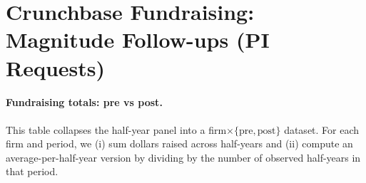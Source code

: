 \documentclass{article}
\newcommand{\cleanedresultsdir}{../results/cleaned/tex}
\begin{document}
\thispagestyle{empty}

\section*{Crunchbase Fundraising: Magnitude Follow-ups (PI Requests)}

\paragraph{Fundraising totals: pre vs post.}
This table collapses the half-year panel into a firm$\times\{\text{pre},\text{post}\}$ dataset.
For each firm and period, we (i) sum dollars raised across half-years and (ii) compute an average-per-half-year version by dividing by the number of observed half-years in that period.

\begin{table}[H]
\caption{\textbf{Fundraising totals: pre vs post}}

\end{table}

\begin{table}[H]
\caption{\textbf{Fundraising outcomes}}

\end{table}

\begin{table}[H]
\caption{\textbf{Additional outcomes}}

\end{table}
\end{document}
